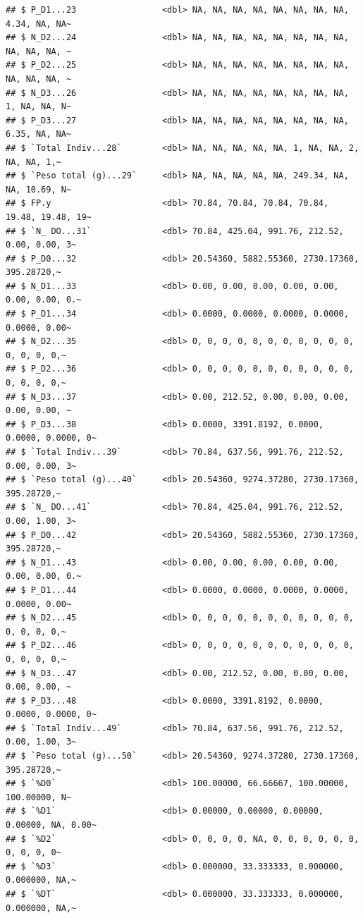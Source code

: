 \documentclass[
]{article}
\begin{document}
\begin{verbatim}
## $ P_D1...23                 <dbl> NA, NA, NA, NA, NA, NA, NA, NA, 4.34, NA, NA~
## $ N_D2...24                 <dbl> NA, NA, NA, NA, NA, NA, NA, NA, NA, NA, NA, ~
## $ P_D2...25                 <dbl> NA, NA, NA, NA, NA, NA, NA, NA, NA, NA, NA, ~
## $ N_D3...26                 <dbl> NA, NA, NA, NA, NA, NA, NA, NA, 1, NA, NA, N~
## $ P_D3...27                 <dbl> NA, NA, NA, NA, NA, NA, NA, NA, 6.35, NA, NA~
## $ `Total Indiv...28`        <dbl> NA, NA, NA, NA, NA, 1, NA, NA, 2, NA, NA, 1,~
## $ `Peso total (g)...29`     <dbl> NA, NA, NA, NA, NA, 249.34, NA, NA, 10.69, N~
## $ FP.y                      <dbl> 70.84, 70.84, 70.84, 70.84, 19.48, 19.48, 19~
## $ `N_ DO...31`              <dbl> 70.84, 425.04, 991.76, 212.52, 0.00, 0.00, 3~
## $ P_D0...32                 <dbl> 20.54360, 5882.55360, 2730.17360, 395.28720,~
## $ N_D1...33                 <dbl> 0.00, 0.00, 0.00, 0.00, 0.00, 0.00, 0.00, 0.~
## $ P_D1...34                 <dbl> 0.0000, 0.0000, 0.0000, 0.0000, 0.0000, 0.00~
## $ N_D2...35                 <dbl> 0, 0, 0, 0, 0, 0, 0, 0, 0, 0, 0, 0, 0, 0, 0,~
## $ P_D2...36                 <dbl> 0, 0, 0, 0, 0, 0, 0, 0, 0, 0, 0, 0, 0, 0, 0,~
## $ N_D3...37                 <dbl> 0.00, 212.52, 0.00, 0.00, 0.00, 0.00, 0.00, ~
## $ P_D3...38                 <dbl> 0.0000, 3391.8192, 0.0000, 0.0000, 0.0000, 0~
## $ `Total Indiv...39`        <dbl> 70.84, 637.56, 991.76, 212.52, 0.00, 0.00, 3~
## $ `Peso total (g)...40`     <dbl> 20.54360, 9274.37280, 2730.17360, 395.28720,~
## $ `N_ DO...41`              <dbl> 70.84, 425.04, 991.76, 212.52, 0.00, 1.00, 3~
## $ P_D0...42                 <dbl> 20.54360, 5882.55360, 2730.17360, 395.28720,~
## $ N_D1...43                 <dbl> 0.00, 0.00, 0.00, 0.00, 0.00, 0.00, 0.00, 0.~
## $ P_D1...44                 <dbl> 0.0000, 0.0000, 0.0000, 0.0000, 0.0000, 0.00~
## $ N_D2...45                 <dbl> 0, 0, 0, 0, 0, 0, 0, 0, 0, 0, 0, 0, 0, 0, 0,~
## $ P_D2...46                 <dbl> 0, 0, 0, 0, 0, 0, 0, 0, 0, 0, 0, 0, 0, 0, 0,~
## $ N_D3...47                 <dbl> 0.00, 212.52, 0.00, 0.00, 0.00, 0.00, 0.00, ~
## $ P_D3...48                 <dbl> 0.0000, 3391.8192, 0.0000, 0.0000, 0.0000, 0~
## $ `Total Indiv...49`        <dbl> 70.84, 637.56, 991.76, 212.52, 0.00, 1.00, 3~
## $ `Peso total (g)...50`     <dbl> 20.54360, 9274.37280, 2730.17360, 395.28720,~
## $ `%D0`                     <dbl> 100.00000, 66.66667, 100.00000, 100.00000, N~
## $ `%D1`                     <dbl> 0.00000, 0.00000, 0.00000, 0.00000, NA, 0.00~
## $ `%D2`                     <dbl> 0, 0, 0, 0, NA, 0, 0, 0, 0, 0, 0, 0, 0, 0, 0~
## $ `%D3`                     <dbl> 0.000000, 33.333333, 0.000000, 0.000000, NA,~
## $ `%DT`                     <dbl> 0.000000, 33.333333, 0.000000, 0.000000, NA,~
\end{verbatim}
\end{document}
